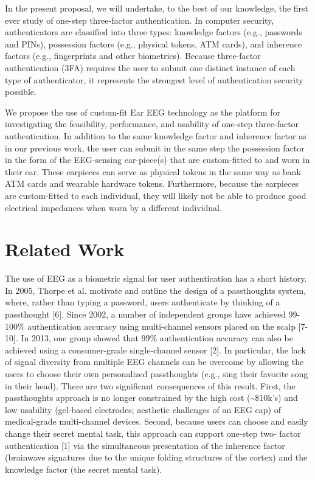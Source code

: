 \documentclass[11pt]{article}
\begin{document}
In the present proposal, we will undertake, to the best of our knowledge, the first
ever study of one-step three-factor authentication. In computer security,
authenticators are classified into three types: knowledge factors (e.g., passwords
and PINs), possession factors (e.g., physical tokens, ATM cards), and inherence
factors (e.g., fingerprints and other biometrics). Because three-factor
authentication (3FA) requires the user to submit one distinct instance of each
type of authenticator, it represents the strongest level of authentication security
possible.

We propose the use of custom-fit Ear EEG technology as the platform for
investigating the feasibility, performance, and usability of one-step three-factor
authentication. In addition to the same knowledge factor and inherence factor as
in our previous work, the user can submit in the same step the possession factor
in the form of the EEG-sensing ear-piece(s) that are custom-fitted to and worn in
their ear. These earpieces can serve as physical tokens in the same way as bank
ATM cards and wearable hardware tokens. Furthermore, because the earpieces
are custom-fitted to each individual, they will likely not be able to produce good
electrical impedances when worn by a different individual.

\section{Related Work}
\label{sec:org9b2bd46}
The use of EEG as a biometric signal for user authentication has a short history.
In 2005, Thorpe et al. motivate and outline the design of a passthoughts system,
where, rather than typing a password, users authenticate 
by thinking of a passthought [6]. Since 2002, a number of independent groups have achieved 99-
100\% authentication accuracy using multi-channel sensors placed on the scalp
[7-10]. In 2013, one group showed that 99\% authentication accuracy can also be
achieved using a consumer-grade single-channel sensor [2]. In particular, the
lack of signal diversity from multiple EEG channels can be overcome by allowing
the users to choose their own personalized passthoughts (e.g., sing their favorite
song in their head). There are two significant consequences of this result. First,
the passthoughts approach is no longer constrained by the high cost (\textasciitilde{}\$10k’s)
and low usability (gel-based electrodes; aesthetic challenges of an EEG cap) of
medical-grade multi-channel devices. Second, because users can choose and
easily change their secret mental task, this approach can support one-step two-
factor authentication [1] via the simultaneous presentation of the inherence factor
(brainwave signatures due to the unique folding structures of the cortex) and the
knowledge factor (the secret mental task).
\end{document}
